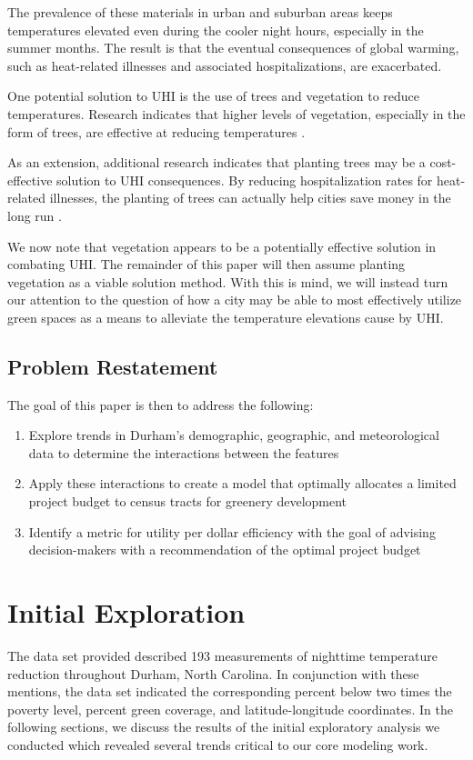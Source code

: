 \documentclass[11pt]{article}
\begin{document}
The prevalence of these materials in urban and suburban areas keeps temperatures elevated even during the cooler night hours, especially in the summer months. The result is that the eventual consequences of global warming, such as heat-related illnesses and associated hospitalizations, are exacerbated.

One potential solution to UHI is the use of trees and vegetation to reduce temperatures. Research indicates that higher levels of vegetation, especially in the form of trees, are effective at reducing temperatures \cite{osti_10180633}.

As an extension, additional research indicates that planting trees may be a cost-effective solution to UHI consequences. By reducing hospitalization rates for heat-related illnesses, the planting of trees can actually help cities save money in the long run \cite{mcpherson_simpson_peper_maco_xiao_2005}.

We now note that vegetation appears to be a potentially effective solution in combating UHI. The remainder of this paper will then assume planting vegetation as a viable solution method. With this is mind, we will instead turn our attention to the question of how a city may be able to most effectively utilize green spaces as a means to alleviate the temperature elevations cause by UHI.

\subsection{Problem Restatement}
\noindent The goal of this paper is then to address the following:
\begin{enumerate}
    \item Explore trends in Durham's demographic, geographic, and meteorological data to determine the interactions between the features
    \item Apply these interactions to create a model that optimally allocates a limited project budget to census tracts for greenery development
    \item Identify a metric for utility per dollar efficiency with the goal of advising decision-makers with a recommendation of the optimal project budget
\end{enumerate}
\pagebreak

\section{Initial Exploration}
The data set provided described 193 measurements of nighttime temperature reduction throughout Durham, North Carolina. In conjunction with these mentions, the data set indicated the corresponding percent below two times the poverty level, percent green coverage, and latitude-longitude coordinates. In the following sections, we discuss the results of the initial exploratory analysis we conducted which revealed several trends critical to our core modeling work.
\end{document}
